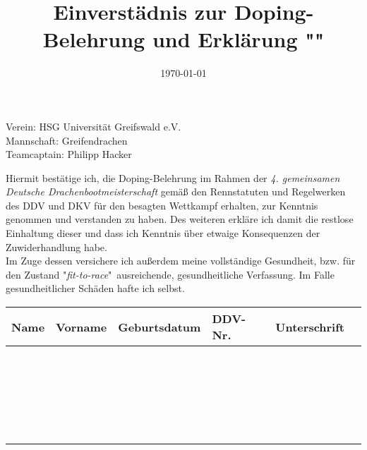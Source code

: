 \documentclass[numbers=noenddot,a4paper]{scrartcl}
\title{Einverstädnis zur Doping-Belehrung und Erklärung "\tilt{fit-to-race}"} %
\date{\today}
\newcommand{\tilt}[1]{\textit{#1}}
\newcommand{\fett}[1]{\textbf{#1}}
\begin{document}
	
	\maketitle
	
	\begin{center}
		Verein: HSG Universität Greifswald e.V.\\
		Mannschaft: Greifendrachen\\
		Teamcaptain: Philipp Hacker
	\end{center}
	
	Hiermit bestätige ich, die Doping-Belehrung im Rahmen der \tilt{4. gemeinsamen Deutsche Drachenbootmeisterschaft} gemäß den Rennstatuten und Regelwerken des DDV und DKV für den besagten Wettkampf erhalten, zur Kenntnis genommen und verstanden zu haben. Des weiteren erkläre ich damit die restlose Einhaltung dieser und dass ich Kenntnis über etwaige Konsequenzen der Zuwiderhandlung habe.\\
	Im Zuge dessen versichere ich außerdem meine vollständige Gesundheit, bzw. für den Zustand "\tilt{fit-to-race}"\ ausreichende, gesundheitliche Verfassung. Im Falle gesundheitlicher Schäden hafte ich selbst.
	
	\centering
	
	\vspace{1cm}
	
		\begin{tabularx}{\textwidth}{|X|X|X|X|X|X|}
			\hline  \fett{Name} & \fett{Vorname} & \fett{Geburtsdatum} & \fett{DDV-Nr.} & \fett{Unterschrift} \\ 
			\hline  &  &  &  &  \\ 
			\hline  &  &  &  &  \\ 
			\hline  &  &  &  &  \\ 
			\hline  &  &  &  &  \\ 
			\hline  &  &  &  &  \\ 
			\hline  &  &  &  &  \\ 
			\hline  &  &  &  &  \\ 
			\hline  &  &  &  &  \\ 
			\hline  &  &  &  &  \\ 
			\hline  &  &  &  &  \\ 
			\hline  &  &  &  &  \\ 
			\hline  &  &  &  &  \\ 
			\hline  &  &  &  &  \\ 
			\hline  &  &  &  &  \\ 
			\hline  &  &  &  &  \\ 
			\hline  &  &  &  &  \\ 
			\hline  &  &  &  &  \\ 
			\hline  &  &  &  &  \\ 
			\hline  &  &  &  &  \\ 
			\hline  &  &  &  &  \\ 
			\hline  &  &  &  &  \\ 
			\hline  &  &  &  &  \\ 
			\hline  &  &  &  &  \\ 
			\hline 
		\end{tabularx} 
		
\end{document}
